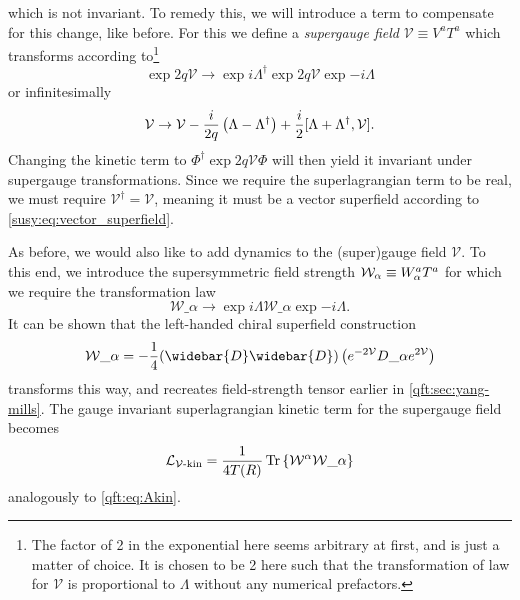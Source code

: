 \documentclass[../main.tex]{subfiles}
\begin{document}
which is not invariant.
To remedy this, we will introduce a term to compensate for this change, like before.
For this we define a   \emph{supergauge field} \(\mathcal{V} \equiv V^a T^a\) which transforms according to\footnote{The factor of 2 in the exponential here seems arbitrary at first, and is just a matter of choice. It is chosen to be 2 here such that the transformation of law for \(\mathcal{V}\) is proportional to \(\Lambda\) without any numerical prefactors.}
\begin{equation}
  \exp{2q\mathcal{V}} \to \exp{i\Lambda^\dagger} \exp{2q\mathcal{V}} \exp{-i\Lambda}
\end{equation}
or infinitesimally
\begin{equation}
  \mathcal{V} \to \mathcal{V} - \frac{i}{2q} \left(\Lambda - \Lambda^\dagger\right) + \frac{i}{2} [\Lambda + \Lambda^\dagger,\mathcal{V}].
\end{equation}
Changing the kinetic term to \(\Phi^\dagger \exp{2q\mathcal{V}} \Phi\) will then yield it invariant under supergauge transformations.
Since we require the superlagrangian term to be real, we must require \(\mathcal{V}^\dagger = \mathcal{V}\), meaning it must be a vector superfield according to \cref{susy:eq:vector_superfield}.

As before, we would also like to add dynamics to the (super)gauge field \(\mathcal{V}\).
To this end, we introduce the supersymmetric field strength \(\mathcal{W}_\alpha \equiv W\indices*{^a_\alpha} T^a\) for which we require the transformation law
\begin{equation}
  \mathcal{W}\_\alpha \to \exp{i\Lambda} \mathcal{W}\_\alpha \exp{-i\Lambda}.
\end{equation}
It can be shown that the left-handed chiral superfield construction
\begin{equation}
  \label{susy:eq:superfield_strength}
  \mathcal{W}\_\alpha = -\frac{1}{4} (\widebar{D}\widebar{D}) \pclosed{\exp{-2\mathcal{V}} D\_\alpha \exp{2\mathcal{V}}}
\end{equation}
transforms this way, and recreates field-strength tensor earlier in \cref{qft:sec:yang-mills}.\cite{Martin:1997ns}
The gauge invariant superlagrangian kinetic term for the supergauge field becomes
\begin{equation}
  \label{susy:eq:Vkin}
  \L_{\mathcal{V}\text{-kin}} = \frac{1}{4 T(R)} \tr\cclosed{ \mathcal{W}\^\alpha \mathcal{W}\_\alpha }
\end{equation}
analogously to \cref{qft:eq:Akin}.
\\
\end{document}
